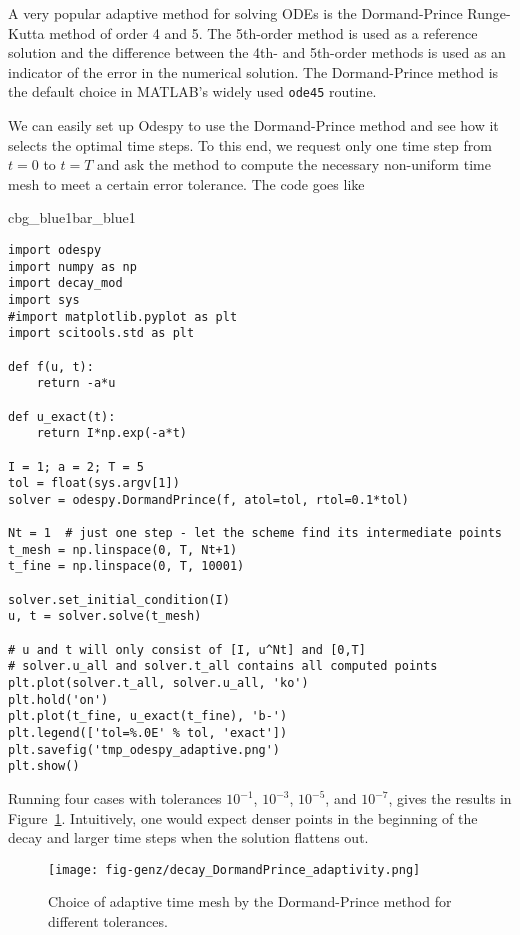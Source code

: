 \documentclass[graybox,sectrefs,envcountresetchap,open=right,final]{svmonodo}
\newenvironment{_pro_tight}[2]{
   \def\FrameCommand{\color{#2}\vrule width 1mm\normalcolor\colorbox{#1}}
   \FrameRule0.6pt\MakeFramed {\advance\hsize-2mm\FrameRestore}\vskip3mm}
   {\vskip0mm\endMakeFramed}
\newenvironment{pro}[2]{
\bgroup\rmfamily
\fboxsep=0mm\relax
\begin{_pro_tight}{#1}{#2}
\list{}{\parsep=-2mm\parskip=0mm\topsep=0pt\leftmargin=2mm
\rightmargin=2\leftmargin\leftmargin=4pt\relax}
\item\relax}
{\endlist\end{_pro_tight}\egroup}
\begin{document}
 

A very popular adaptive method for solving ODEs is the Dormand-Prince
Runge-Kutta method of order 4 and 5. The 5th-order method is used as a
reference solution and the difference between the 4th- and 5th-order
methods is used as an indicator of the error in the numerical
solution.  The Dormand-Prince method is the default choice in MATLAB's
widely used \texttt{ode45} routine.

We can easily set up Odespy to use the Dormand-Prince method and
see how it selects the optimal time steps. To this end, we request
only one time step from $t=0$ to $t=T$ and ask the method to
compute the necessary non-uniform time mesh to meet a certain
error tolerance. The code goes like

\begin{pro}{cbg_blue1}{bar_blue1}\begin{Verbatim}[numbers=none,fontsize=\fontsize{9pt}{9pt},baselinestretch=0.95,xleftmargin=2mm]
import odespy
import numpy as np
import decay_mod
import sys
#import matplotlib.pyplot as plt
import scitools.std as plt

def f(u, t):
    return -a*u

def u_exact(t):
    return I*np.exp(-a*t)

I = 1; a = 2; T = 5
tol = float(sys.argv[1])
solver = odespy.DormandPrince(f, atol=tol, rtol=0.1*tol)

Nt = 1  # just one step - let the scheme find its intermediate points
t_mesh = np.linspace(0, T, Nt+1)
t_fine = np.linspace(0, T, 10001)

solver.set_initial_condition(I)
u, t = solver.solve(t_mesh)

# u and t will only consist of [I, u^Nt] and [0,T]
# solver.u_all and solver.t_all contains all computed points
plt.plot(solver.t_all, solver.u_all, 'ko')
plt.hold('on')
plt.plot(t_fine, u_exact(t_fine), 'b-')
plt.legend(['tol=%.0E' % tol, 'exact'])
plt.savefig('tmp_odespy_adaptive.png')
plt.show()
\end{Verbatim}
\end{pro}
\noindent

Running four cases with tolerances $10^{-1}$, $10^{-3}$, $10^{-5}$,
and $10^{-7}$, gives the results in Figure~\ref{decay:odespy:fig2}.
Intuitively, one would expect denser points in the beginning of
the decay and larger time steps when the solution flattens out.


\begin{figure}[!ht]  %
  \centerline{\texttt{[image: fig-genz/decay\_DormandPrince\_adaptivity.png]}}
  \caption{
  Choice of adaptive time mesh by the Dormand-Prince method for different tolerances. \label{decay:odespy:fig2}
  }
\end{figure}
\end{document}
